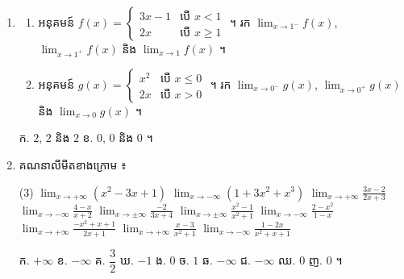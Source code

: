 \begin{enumerate}[1]
\begin{enumerate}[a]
    \item រកចំនួនពិត $a$ និង $b$ ដើម្បីឱ្យ $\displaystyle\lim_{x \to 1}\frac{x^2 + ax + b}{x - 1} = 5$ ។
    \item រកចំនួនពិត $p$ និង $q$ ដើម្បីឱ្យ $\displaystyle\lim_{x \to -2}\frac{x^2 + px - 6}{2x^2 + 3x - 2} = q$ ។
    \item រកចំនួនពិត $m$ និង $n$ ដើម្បីឱ្យ $\displaystyle\lim_{x \to 2}\frac{x^2 + mx + 8}{x^2 - (n + 2)x + 2n} = \frac{1}{5}$ ។
  \end{enumerate}
  \ans
  ក. $a = 3$, $b = -4$ \quad ខ. $p = -1$, $q = 1$ \quad គ. $m = -6$, $n = 12$ ។
  \item \begin{enumerate}[a]
    \item អនុគមន៍ $f(x) = \begin{cases} 3x - 1 & \text{បើ } x < 1\\ 2x & \text{បើ } x \ge 1 \end{cases}$ ។ រក $\displaystyle\lim_{x \to 1^-} f(x)$, $\displaystyle\lim_{x \to 1^+} f(x)$ និង $\displaystyle\lim_{x \to 1} f(x)$ ។
    \item អនុគមន៍ $g(x) = \begin{cases} x^2 & \text{បើ } x \le 0\\ 2x & \text{បើ } x > 0 \end{cases}$ ។ រក $\displaystyle\lim_{x \to 0^-} g(x)$, $\displaystyle\lim_{x \to 0^+} g(x)$ និង $\displaystyle\lim_{x \to 0} g(x)$ ។
  \end{enumerate}
  \ans
  ក. $2$, $2$ និង $2$ \quad ខ. $0$, $0$ និង $0$ ។
  \item គណនាលីមីតខាងក្រោម ៖
  \begin{tasks}(3)
    \task $\displaystyle\lim_{x \to +\infty}(x^2 - 3x + 1)$
    \task $\displaystyle\lim_{x \to -\infty}(1 + 3x^2 + x^3)$
    \task $\displaystyle\lim_{x \to +\infty}\frac{3x - 2}{2x + 3}$
    \task $\displaystyle\lim_{x \to -\infty}\frac{4 - x}{x + 2}$
    \task $\displaystyle\lim_{x \to \pm\infty}\frac{-2}{3x + 4}$
    \task $\displaystyle\lim_{x \to \pm\infty}\frac{x^2 - 1}{x^2 + 1}$
    \task $\displaystyle\lim_{x \to -\infty}\frac{2 - x^2}{1 - x}$
    \task $\displaystyle\lim_{x \to +\infty}\frac{-x^2 + x + 1}{2x + 1}$
    \task $\displaystyle\lim_{x \to +\infty}\frac{x - 3}{x^2 + 1}$
    \task $\displaystyle\lim_{x \to -\infty}\frac{1 - 2x}{x^2 + x + 1}$
  \end{tasks}
  \ans
  ក. $+\infty$ \quad ខ. $-\infty$ \quad គ. $\dfrac{3}{2}$ \quad ឃ. $-1$ \quad ង. $0$ \quad ច. $1$ \quad ឆ. $-\infty$ \quad ជ. $-\infty$ \quad ឈ. $0$ \quad ញ. $0$ ។

\end{enumerate}
